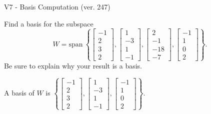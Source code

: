 \begin{exercise}
  \begin{exerciseTitle}V7 - Basis Computation (ver. 247)\end{exerciseTitle}
  \begin{exerciseStatement}
    Find a basis for the subspace 
\[W=\mathrm{span}\ \left\{\left[\begin{array}{r}
-1 \\
2 \\
3 \\
2
\end{array}\right] , \left[\begin{array}{r}
1 \\
-3 \\
1 \\
-1
\end{array}\right] , \left[\begin{array}{r}
2 \\
-1 \\
-18 \\
-7
\end{array}\right] , \left[\begin{array}{r}
-1 \\
1 \\
0 \\
2
\end{array}\right]\right\}.\]
 Be sure to explain why your result is a basis.


  \end{exerciseStatement}
  \begin{exerciseAnswer}
   A basis of \(W\) is  \(\left\{\left[\begin{array}{r}
-1 \\
2 \\
3 \\
2
\end{array}\right] , \left[\begin{array}{r}
1 \\
-3 \\
1 \\
-1
\end{array}\right] , \left[\begin{array}{r}
-1 \\
1 \\
0 \\
2
\end{array}\right]\right\}\).
  


  \end{exerciseAnswer}
\end{exercise}